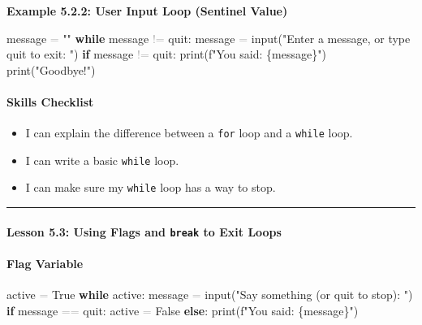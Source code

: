 \documentclass[
  justified,
  openright,
]{tufte-book}
\let\subsection\paragraph
\let\paragraph\paragraph
\newcommand{\KeywordTok}[1]{\textcolor{CodeKeyword}{\textbf{#1}}}  %
\newcommand{\StringTok}[1]{\textcolor{CodeString}{#1}}              %
\newcommand{\OperatorTok}[1]{\textcolor{DarkGray}{#1}}              %
\newenvironment{Shaded}{%
  \begin{mdframed}[style=TufteCode]%
}{%
  \end{mdframed}%
}
\let\subsection\paragraph
\let\paragraph\paragraph
\providecommand{\tightlist}{%
  \setlength{\itemsep}{0pt}\setlength{\parskip}{0pt}}
\begin{document}
\textbf{Example 5.2.2: User Input Loop (Sentinel Value)}

\begin{Shaded}
\begin{Highlighting}[]
message \OperatorTok{=} \StringTok{""}
\KeywordTok{while} message \OperatorTok{!=} \StringTok{\textquotesingle{}quit\textquotesingle{}}:
    message \OperatorTok{=} input(\StringTok{"Enter a message, or type \textquotesingle{}quit\textquotesingle{} to exit: "})
    \KeywordTok{if} message \OperatorTok{!=} \StringTok{\textquotesingle{}quit\textquotesingle{}}:
        print(\StringTok{f"You said: }\StringTok{\{}message\StringTok{\}}\StringTok{"})
print(\StringTok{"Goodbye!"})
\end{Highlighting}
\end{Shaded}

\subsection{Skills Checklist}\label{skills-checklist-23}

\begin{itemize}
\tightlist
\item[$\square$]
  I can explain the difference between a \texttt{for} loop and a
  \texttt{while} loop.
\item[$\square$]
  I can write a basic \texttt{while} loop.
\item[$\square$]
  I can make sure my \texttt{while} loop has a way to stop.
\end{itemize}

\begin{center}\rule{0.5\linewidth}{0.5pt}\end{center}

\subsection{\texorpdfstring{Lesson 5.3: Using Flags and \texttt{break}
to Exit
Loops}{Lesson 5.3: Using Flags and break to Exit Loops}}\label{lesson-5.3-using-flags-and-break-to-exit-loops}

\subsection{Flag Variable}\label{flag-variable}

\begin{Shaded}
\begin{Highlighting}[]
active \OperatorTok{=} True
\KeywordTok{while} active:
    message \OperatorTok{=} input(\StringTok{"Say something (or \textquotesingle{}quit\textquotesingle{} to stop): "})
    \KeywordTok{if} message \OperatorTok{==} \StringTok{\textquotesingle{}quit\textquotesingle{}}:
        active \OperatorTok{=} False
    \KeywordTok{else}:
        print(\StringTok{f"You said: }\StringTok{\{}message\StringTok{\}}\StringTok{"})
\end{Highlighting}
\end{Shaded}
\end{document}
